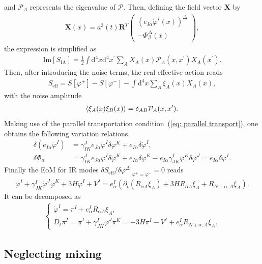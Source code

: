 \documentclass[aps, prd
, preprint
, nofootinbib 
]{revtex4-1}
\newcommand{\dd}{\mathrm{d}}
\newcommand{\calP}{\mathcal{P}}
\renewcommand{\Im}{\mathrm{Im}}
\newcommand{\bae}[1]{\begin{align} #1 \end{align}}
\newcommand{\bce}[1]{\begin{cases} #1 \end{cases}}
\newcommand{\bpme}[1]{\begin{pmatrix} #1 \end{pmatrix}}
\begin{document}
and $\calP_A$ represents the eigenvalue of $\bm{\calP}$.
Then, defining the field vector $\bm{X}$ by
\bae{
	\bm{X}(x)=a^3(t)\bm{R}^T
	\bpme{
		\left(e_{I\alpha}\dot{\varphi}^I(x)\right)^\Delta \\
		-\Phi_\beta^\Delta(x)
	},
}
the expression is simplified as
\bae{
	\Im[S_\text{IA}]=\frac{1}{2}\int\dd^4x\dd^4x^\prime\sum_AX_A(x)\calP_A(x,x^\prime)X_A(x^\prime).
}
Then, after introducing the noise terms, the real effective action reads
\bae{
	S_\text{eff}=S[\varphi^+]-S[\varphi^-]-\int\dd^4x\sum_A\xi_A(x)X_A(x),
}
with the noise amplitude
\bae{
	\braket{\xi_A(x)\xi_B(x)}=\delta_{AB}\calP_A(x,x^\prime).
}
Making use of the parallel transportation condition~(\ref{eq: parallel transport}), one obtains the following variation relations.
\bae{
	\delta\left(e_{I\alpha}\dot{\varphi}^I\right)&=\gamma^J_{IK}e_{J\alpha}\dot{\varphi}^I\delta\varphi^K+e_{I\alpha}\delta\dot{\varphi}^I, \\
	\delta\Phi_\alpha&=\gamma^J_{IK}e_{J\alpha}\varphi^I\delta\varphi^K+e_{I\alpha}\delta\varphi^K-e_{I\alpha}\gamma^I_{JK}\varphi^K\delta\varphi^J
	=e_{I\alpha}\delta\varphi^I.
}
Finally the EoM for IR modes $\delta S_\text{eff}/\delta\varphi^\Delta|_{\varphi^+=\varphi^-}=0$ reads
\bae{
	\ddot{\varphi}^I+\gamma^I_{JK}\dot{\varphi}^J\dot{\varphi}^K+3H\dot{\varphi}^I+V^I=
	e^I_\alpha\left(\partial_t(R_{\alpha A}\xi_A)+3HR_{\alpha A}\xi_A+R_{N+\alpha,A}\xi_A\right).
}
It can be decomposed as
\bae{\label{eq: general Langevin}
	\bce{
		\displaystyle
		\dot{\varphi}^I=\pi^I+e^I_\alpha R_{\alpha A}\xi_A, \\
		\displaystyle
		D_t\pi^I=\dot{\pi}^I+\gamma^I_{JK}\dot{\varphi}^J\pi^K=-3H\pi^I-V^I+e^I_\alpha R_{N+\alpha,A}\xi_A.
	}
}




\subsection{Neglecting mixing}
\end{document}
